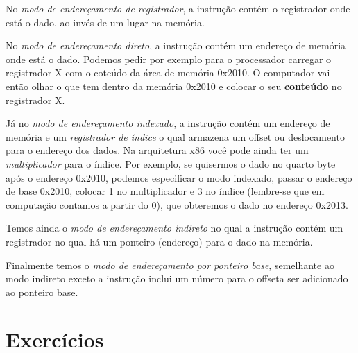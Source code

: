 No \emph{modo de endereçamento de registrador}, a instrução contém o registrador onde está o dado, ao invés de um lugar na memória.

No \emph{modo de endereçamento direto}, a instrução contém um endereço de memória onde está o dado. Podemos pedir por exemplo para o processador carregar o registrador X com o coteúdo da área de memória 0x2010. O computador vai então olhar o que tem dentro da memória 0x2010 e colocar o seu \textbf{conteúdo} no registrador X.

Já no \emph{modo de endereçamento indexado}, a instrução contém um endereço de memória e um \emph{registrador de índice} o qual armazena um offset ou deslocamento para o endereço dos dados. Na arquitetura x86 você pode ainda ter um \emph{multiplicador} para o índice. Por exemplo, se quisermos o dado no quarto byte após o endereço 0x2010, podemos especificar o modo indexado, passar o endereço de base 0x2010, colocar 1 no multiplicador e 3 no índice (lembre-se que em computação contamos a partir do 0), que obteremos o dado no endereço 0x2013.

Temos ainda o \emph{modo de endereçamento indireto} no qual a instrução contém um registrador no qual há um ponteiro (endereço) para o dado na memória.

Finalmente temos o \emph{modo de endereçamento por ponteiro base}, semelhante ao modo indireto exceto a instrução inclui um número para o offseta ser adicionado ao ponteiro base.

\section{Exercícios}

